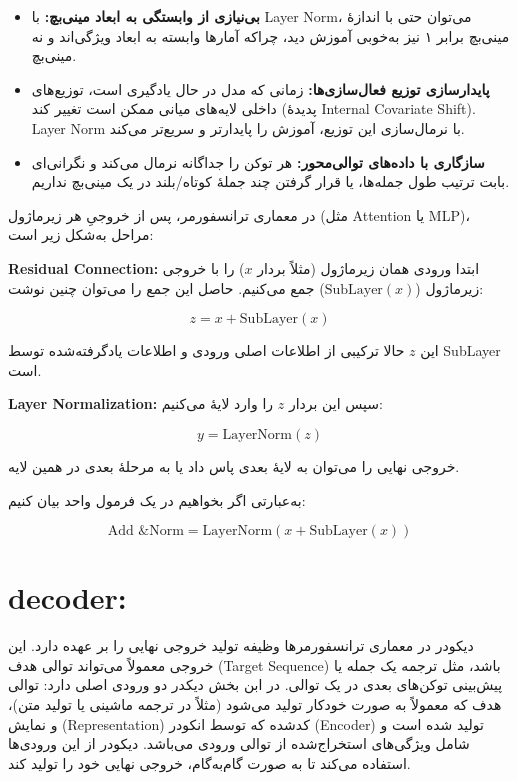 \begin{itemize}
	\item \textbf{بی‌نیازی از وابستگی به ابعاد مینی‌بچ:}  
	با Layer Norm، می‌توان حتی با اندازهٔ مینی‌بچ برابر ۱ نیز به‌خوبی آموزش دید، چراکه آمارها وابسته به ابعاد ویژگی‌اند و نه مینی‌بچ.
	
	\item \textbf{پایدارسازی توزیع فعال‌سازی‌ها:}  
	زمانی که مدل در حال یادگیری است، توزیع‌های داخلی لایه‌های میانی ممکن است تغییر کند (پدیدهٔ Internal Covariate Shift). Layer Norm با نرمال‌سازی این توزیع، آموزش را پایدارتر و سریع‌تر می‌کند.
	
	\item \textbf{سازگاری با داده‌های توالی‌محور:}  
	هر توکن را جداگانه نرمال می‌کند و نگرانی‌ای بابت ترتیب طول جمله‌ها، یا قرار گرفتن چند جملهٔ کوتاه/بلند در یک مینی‌بچ نداریم.
\end{itemize}





در معماری ترانسفورمر، پس از خروجیِ هر زیرماژول (مثل Attention یا MLP)، مراحل به‌شکل زیر است:

\textbf{Residual Connection:} ابتدا ورودی همان زیرماژول (مثلاً بردار \( x \)) را با خروجی زیرماژول (\( \text{SubLayer}(x) \)) جمع می‌کنیم. حاصل این جمع را می‌توان چنین نوشت:

\[
z = x + \text{SubLayer}(x)
\]

این \( z \) حالا ترکیبی از اطلاعات اصلی ورودی و اطلاعات یادگرفته‌شده توسط SubLayer است.

\textbf{Layer Normalization:} سپس این بردار \( z \) را وارد لایهٔ  می‌کنیم:

\[
y = \text{LayerNorm}(z)
\]

خروجی نهایی را می‌توان به لایهٔ بعدی پاس داد یا به مرحلهٔ بعدی در همین لایه.

به‌عبارتی اگر بخواهیم در یک فرمول واحد بیان کنیم:

\[
\text{Add \& Norm} = \text{LayerNorm}\left(x + \text{SubLayer}(x)\right)
\]

\section{decoder:}

دیکودر  در معماری ترانسفورمرها وظیفه تولید خروجی نهایی را بر عهده دارد. این خروجی معمولاً می‌تواند توالی هدف (Target Sequence) باشد، مثل ترجمه یک جمله یا پیش‌بینی توکن‌های بعدی در یک توالی.
در ابن بخش دیکدر دو ورودی اصلی دارد:
 توالی هدف که معمولاً به صورت خودکار تولید می‌شود (مثلاً در ترجمه ماشینی یا تولید متن)، و نمایش (Representation) کدشده که توسط انکودر (Encoder) تولید شده است و شامل ویژگی‌های استخراج‌شده از توالی ورودی می‌باشد. دیکودر از این ورودی‌ها استفاده می‌کند تا به صورت گام‌به‌گام، خروجی نهایی خود را تولید کند.
 
